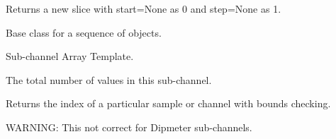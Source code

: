 \documentclass[letterpaper,10pt,english]{sphinxmanual}
\begin{document}

\begin{fulllineitems}
\label{\detokenize{ref/LIS/core/FrameSet:TotalDepth.LIS.core.FrameSet.sliceDefaults}}
Returns a new slice with start=None as 0 and step=None as 1.

\end{fulllineitems}


\begin{fulllineitems}
\label{\detokenize{ref/LIS/core/FrameSet:TotalDepth.LIS.core.FrameSet.DataSeqBase}}
Base class for a sequence of objects.

\end{fulllineitems}


\begin{fulllineitems}
\label{\detokenize{ref/LIS/core/FrameSet:TotalDepth.LIS.core.FrameSet.SuChArTe}}
Sub-channel Array Template.

\begin{fulllineitems}
\label{\detokenize{ref/LIS/core/FrameSet:TotalDepth.LIS.core.FrameSet.SuChArTe.numValues}}
The total number of values in this sub-channel.

\end{fulllineitems}


\begin{fulllineitems}
\label{\detokenize{ref/LIS/core/FrameSet:TotalDepth.LIS.core.FrameSet.SuChArTe.index}}
Returns the index of a particular sample or channel with bounds checking.

WARNING: This not correct for Dipmeter sub-channels.

\end{fulllineitems}


\end{fulllineitems}
\end{document}
